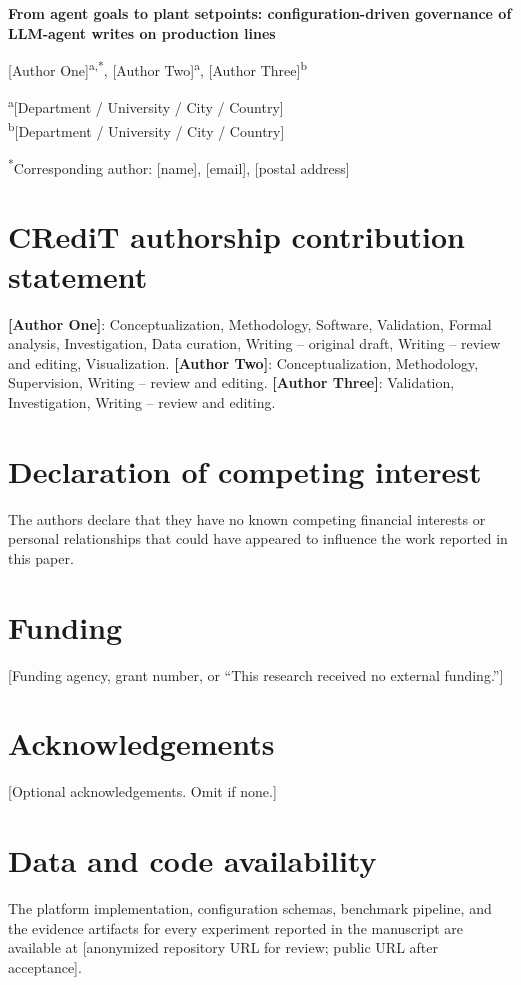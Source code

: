 \documentclass[12pt]{article}
\begin{document}
\begin{center}
{\Large\bfseries From agent goals to plant setpoints: configuration-driven
governance of LLM-agent writes on production lines}

\vspace{1.2em}

[Author One]\textsuperscript{a,*}, [Author Two]\textsuperscript{a},
[Author Three]\textsuperscript{b}

\vspace{0.8em}

\textsuperscript{a}[Department / University / City / Country]\\
\textsuperscript{b}[Department / University / City / Country]

\vspace{0.8em}

\textsuperscript{*}Corresponding author: [name], [email],
[postal address]
\end{center}

\vspace{1.2em}

\section*{CRediT authorship contribution statement}
\textbf{[Author One]}: Conceptualization, Methodology, Software,
Validation, Formal analysis, Investigation, Data curation, Writing --
original draft, Writing -- review and editing, Visualization.
\textbf{[Author Two]}: Conceptualization, Methodology, Supervision,
Writing -- review and editing. \textbf{[Author Three]}: Validation,
Investigation, Writing -- review and editing.

\section*{Declaration of competing interest}
The authors declare that they have no known competing financial interests
or personal relationships that could have appeared to influence the work
reported in this paper.

\section*{Funding}
[Funding agency, grant number, or ``This research received no external
funding.'']

\section*{Acknowledgements}
[Optional acknowledgements. Omit if none.]

\section*{Data and code availability}
The platform implementation, configuration schemas, benchmark pipeline,
and the evidence artifacts for every experiment reported in the manuscript
are available at [anonymized repository URL for review; public URL after
acceptance].
\end{document}
